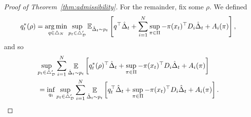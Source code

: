 \documentclass{article}
\newcommand{\rel}{\mathbf{Rel}}
\newcommand{\hist}{{\mathcal H}}
\begin{document}
\begin{proof}[Proof of Theorem~\ref{thm:admissibility}]
For the remainder, fix some $\rho$. We defined
\[
  q_t^*(\rho)
  =
  \operatorname*{arg\,min}_{q \in \triangle_{N}}
  \sup_{p_t \in \triangle_{\mathcal D}'}
  \mathbb E_{\hat\Delta_t\sim p_t}\left[
  q^\top \hat \Delta_t
    +
    \sum_{i=1}^N \sup_{\pi\in\Pi} -\pi(x_t)^\top D_i\hat\Delta_t + A_i(\pi)\right],
  \]
  and so
  \begin{align*}
    &\lefteqn{\sup_{p_t\in\triangle_{\mathcal D}'}\sum_{i=1}^N \mathop{\ex}_{\hat\Delta_t\sim p_t}\left[ q_t^*(\rho)^\top \hat \Delta_t
    +
  \sup_{\pi\in\Pi} -\pi(x_t)^\top D_i\hat\Delta_t + A_i(\pi)\right]}\\
    &=
      \inf_{q_t}
      \sup_{p_t\in\triangle_{\mathcal D}'}\sum_{i=1}^N \mathop{\ex}_{\hat\Delta_t\sim p_t}\left[ q_t^\top \hat \Delta_t
    +
  \sup_{\pi\in\Pi} -\pi(x_t)^\top D_i\hat\Delta_t + A_i(\pi)\right].
\end{align*}


\end{proof}
\end{document}
